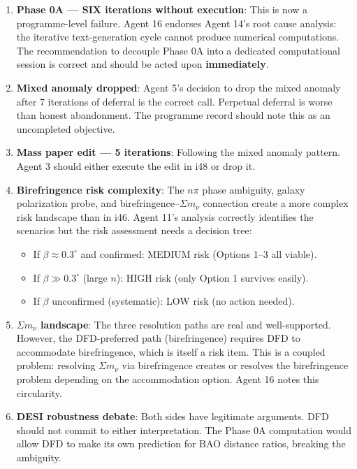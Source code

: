 \documentclass[11pt,a4paper]{article}
\begin{document}
\begin{enumerate}
\item \textbf{Phase 0A --- SIX iterations without execution}: This is now a programme-level failure. Agent 16 endorses Agent 14's root cause analysis: the iterative text-generation cycle cannot produce numerical computations. The recommendation to decouple Phase 0A into a dedicated computational session is correct and should be acted upon \textbf{immediately}.

\item \textbf{Mixed anomaly dropped}: Agent 5's decision to drop the mixed anomaly after 7 iterations of deferral is the correct call. Perpetual deferral is worse than honest abandonment. The programme record should note this as an uncompleted objective.

\item \textbf{Mass paper edit --- 5 iterations}: Following the mixed anomaly pattern. Agent 3 should either execute the edit in i48 or drop it.

\item \textbf{Birefringence risk complexity}: The $n\pi$ phase ambiguity, galaxy polarization probe, and birefringence--$\Sigma m_\nu$ connection create a more complex risk landscape than in i46. Agent 11's analysis correctly identifies the scenarios but the risk assessment needs a decision tree:
\begin{itemize}
\item If $\beta \approx 0.3^\circ$ and confirmed: MEDIUM risk (Options 1--3 all viable).
\item If $\beta \gg 0.3^\circ$ (large $n$): HIGH risk (only Option 1 survives easily).
\item If $\beta$ unconfirmed (systematic): LOW risk (no action needed).
\end{itemize}

\item \textbf{$\Sigma m_\nu$ landscape}: The three resolution paths are real and well-supported. However, the DFD-preferred path (birefringence) requires DFD to accommodate birefringence, which is itself a risk item. This is a coupled problem: resolving $\Sigma m_\nu$ via birefringence creates or resolves the birefringence problem depending on the accommodation option. Agent 16 notes this circularity.

\item \textbf{DESI robustness debate}: Both sides have legitimate arguments. DFD should not commit to either interpretation. The Phase 0A computation would allow DFD to make its own prediction for BAO distance ratios, breaking the ambiguity.
\end{enumerate}
\end{document}
